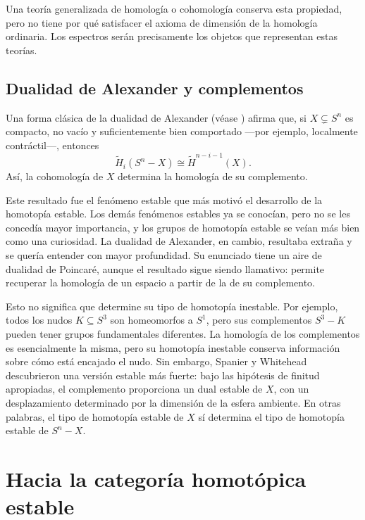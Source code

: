 Una teoría generalizada de homología o cohomología conserva esta propiedad, pero no tiene por qué satisfacer el axioma de dimensión de la homología ordinaria. Los espectros serán precisamente los objetos que representan estas teorías.

\subsection{Dualidad de Alexander y complementos}

Una forma clásica de la dualidad de Alexander (véase \cite{hatcher2002}) afirma que, si \(X\subsetneq S^n\) es compacto, no vacío y suficientemente bien comportado ---por ejemplo, localmente contráctil---, entonces
\[
\widetilde H_i(S^n-X)\cong\widetilde H^{n-i-1}(X).
\]
Así, la cohomología de \(X\) determina la homología de su complemento.

Este resultado fue el fenómeno estable que más motivó el desarrollo de la homotopía estable. Los demás fenómenos estables ya se conocían, pero no se les concedía mayor importancia, y los grupos de homotopía estable se veían más bien como una curiosidad. La dualidad de Alexander, en cambio, resultaba extraña y se quería entender con mayor profundidad. Su enunciado tiene un aire de dualidad de Poincaré, aunque el resultado sigue siendo llamativo: permite recuperar la homología de un espacio a partir de la de su complemento.

Esto no significa que determine su tipo de homotopía inestable. Por ejemplo, todos los nudos \(K\subseteq S^3\) son homeomorfos a \(S^1\), pero sus complementos \(S^3-K\) pueden tener grupos fundamentales diferentes. La homología de los complementos es esencialmente la misma, pero su homotopía inestable conserva información sobre cómo está encajado el nudo.
Sin embargo, Spanier y Whitehead descubrieron una versión estable más fuerte: bajo las hipótesis de finitud apropiadas, el complemento proporciona un dual estable de \(X\), con un desplazamiento determinado por la dimensión de la esfera ambiente. En otras palabras, el tipo de homotopía estable de $X$ sí determina el tipo de homotopía estable de $S^n-X$.

\section{Hacia la categoría homotópica estable}

